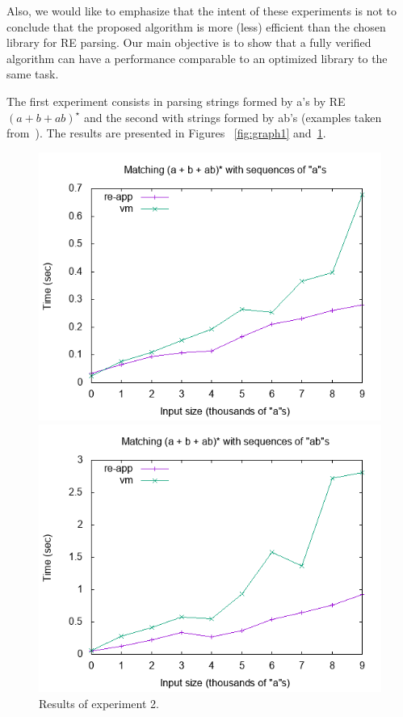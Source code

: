 \documentclass[oneside,12pt]{scrbook}
\theoremstyle{definition}
\theoremstyle{plain}
\theoremstyle{definition}
\begin{document}
Also, we would like to emphasize that the intent of these experiments is not to
conclude that the proposed algorithm is more (less) efficient than the chosen 
library for RE parsing. Our main objective is to show that a fully verified
algorithm can have a performance comparable to an optimized library to the 
same task. 

The first experiment consists in parsing strings formed by a's by RE 
$(a + b + ab)^\star$ and the second with strings formed by ab's 
(examples taken from~\cite{Sulzmann14}). The results are presented in Figures
~\ref{fig:graph1} and~\ref{fig:graph2}.

\begin{figure}[h]
\centering
\begin{minipage}{0.45\textwidth}
	\includegraphics[width=.9\textwidth]{as.png}
	\caption{Results of experiment 1.}
	\label{fig:graph1}
\end{minipage} \hfill
\begin{minipage}{0.45\textwidth}
	\includegraphics[width=.9\textwidth]{abs.png}
	\caption{Results of experiment 2.}
	\label{fig:graph2}
\end{minipage}
\end{figure}
\end{document}
